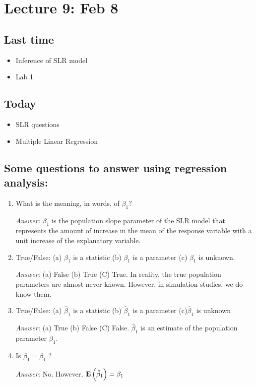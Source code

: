 \setcounter{section}{8}


\section{Lecture 9: Feb 8}


\subsection*{Last time}
\begin{itemize}
  \item Inference of SLR model
  \item Lab 1
\end{itemize}


\subsection*{Today}
\begin{itemize}
  \item SLR questions
  \item Multiple Linear Regression
\end{itemize}



\subsection*{Some questions to answer using regression analysis:}

\begin{enumerate}
  \item What is the meaning, in words, of $\beta_1$?\\
    \begin{pf}
    {\it Answer: }$\beta_1$ is the population slope parameter of the SLR model that represents the amount of increase in the mean of the response variable with a unit increase of the explanatory variable.
    \end{pf}
  \item True/False: (a) $\beta_1$ is a statistic (b) $\beta_1$ is a parameter (c) $\beta_1$ is unknown.\\
    \begin{pf}
    {\it Answer: } (a) False (b) True (C) True.  In reality, the true population parameters are almost never known.  However, in simulation studies, we do know them.
    \end{pf}
  \item True/False: (a) $\hat{\beta}_1$ is a statistic (b) $\hat{\beta}_1$ is a parameter (c)$\hat{\beta}_1$ is unknown\\
    \begin{pf}
    {\it Answer: } (a) True (b) False (C) False.  $\hat{\beta}_1$ is an estimate of the population parameter $\beta_1$.
    \end{pf}
  \item Is $\hat{\beta}_1 = \beta_1$ ?\\
    \begin{pf}
      {\it Answer: } No.  However, ${\mathbf{E}\left(\hat{\beta}_1\right)} = \beta_1$ 
    \end{pf}
\end{enumerate}

